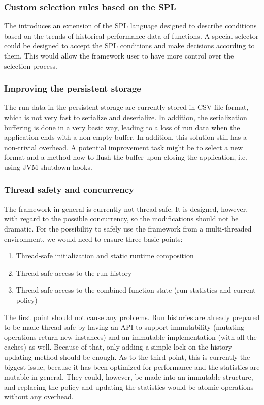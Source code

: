 \subsubsection{Custom selection rules based on the SPL}

The \cite{bulej_performance_2012} introduces an extension of the SPL language designed to describe conditions based on the trends of historical performance data of functions. A special selector could be designed to accept the SPL conditions and make decisions according to them. This would allow the framework user to have more control over the selection process. 

\subsubsection{Improving the persistent storage}

The run data in the persistent storage are currently stored in CSV file format, which is not very fast to serialize and deserialize. In addition, the serialization buffering is done in a very basic way, leading to a loss of run data when the application ends with a non-empty buffer. In addition, this solution still has a non-trivial overhead. A potential improvement task might be to select a new format and a method how to flush the buffer upon closing the application, i.e. using JVM shutdown hooks.

\subsubsection{Thread safety and concurrency}

The framework in general is currently not thread safe. It is designed, however, with regard to the possible concurrency, so the modifications should not be dramatic. For the possibility to safely use the framework from a multi-threaded environment, we would need to ensure three basic points:

\begin{enumerate}
	\item Thread-safe initialization and static runtime composition
	\item Thread-safe access to the run history
	\item Thread-safe access to the combined function state (run statistics and current policy)
\end{enumerate}

The first point should not cause any problems. Run histories are already prepared to be made thread-safe by having an API to support immutability (mutating operations return new instances) and an immutable implementation (with all the caches) as well. Because of that, only adding a simple lock on the history updating method should be enough. As to the third point, this is currently the biggest issue, because it has been optimized for performance and the statistics are mutable in general. They could, however, be made into an immutable structure, and replacing the policy and updating the statistics would be atomic operations without any overhead.

